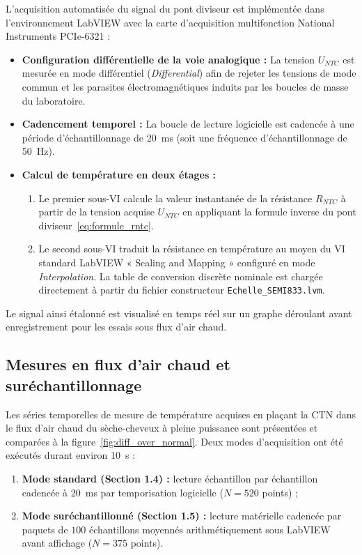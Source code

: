 L'acquisition automatisée du signal du pont diviseur est implémentée dans l'environnement LabVIEW avec la carte d'acquisition multifonction National Instruments PCIe-6321 :
\begin{itemize}[leftmargin=1.2cm]
    \item \textbf{Configuration différentielle de la voie analogique :} La tension $U_{NTC}$ est mesurée en mode différentiel (\textit{Differential}) afin de rejeter les tensions de mode commun et les parasites électromagnétiques induits par les boucles de masse du laboratoire.
    \item \textbf{Cadencement temporel :} La boucle de lecture logicielle est cadencée à une période d'échantillonnage de \qty{20}{\milli\second} (soit une fréquence d'échantillonnage de \qty{50}{\hertz}).
    \item \textbf{Calcul de température en deux étages :}
    \begin{enumerate}
        \item Le premier sous-VI calcule la valeur instantanée de la résistance $R_{NTC}$ à partir de la tension acquise $U_{NTC}$ en appliquant la formule inverse du pont diviseur~\eqref{eq:formule_rntc}.
        \item Le second sous-VI traduit la résistance en température au moyen du VI standard LabVIEW « Scaling and Mapping » configuré en mode \textit{Interpolation}. La table de conversion discrète nominale est chargée directement à partir du fichier constructeur \texttt{Echelle\_SEMI833.lvm}.
    \end{enumerate}
\end{itemize}
Le signal ainsi étalonné est visualisé en temps réel sur un graphe déroulant avant enregistrement pour les essais sous flux d'air chaud.

\subsection{Mesures en flux d'air chaud et suréchantillonnage}
\label{subsec:ntc_oversampling}

Les séries temporelles de mesure de température acquises en plaçant la CTN dans le flux d'air chaud du sèche-cheveux à pleine puissance sont présentées et comparées à la figure~\ref{fig:diff_over_normal}. Deux modes d'acquisition ont été exécutés durant environ \qty{10}{\second} :
\begin{enumerate}[leftmargin=1.2cm]
    \item \textbf{Mode standard (Section 1.4) :} lecture échantillon par échantillon cadencée à \qty{20}{\milli\second} par temporisation logicielle ($N = 520$ points) ;
    \item \textbf{Mode suréchantillonné (Section 1.5) :} lecture matérielle cadencée par paquets de $100$ échantillons moyennés arithmétiquement sous LabVIEW avant affichage ($N = 375$ points).
\end{enumerate}

